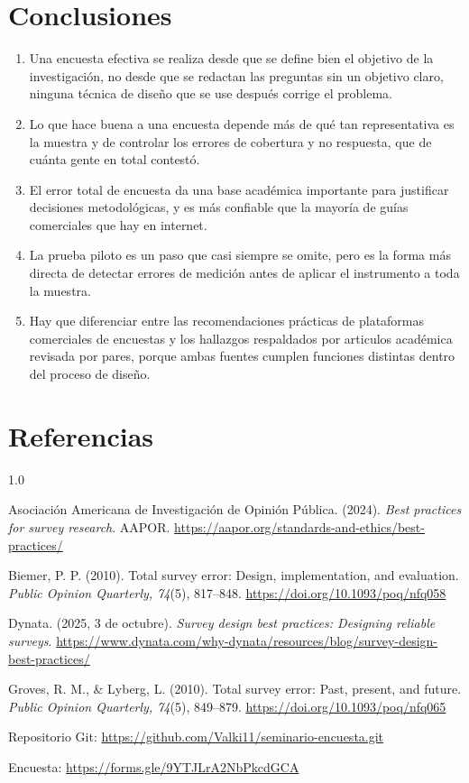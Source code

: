 \documentclass[12pt,letterpaper]{article}
\begin{document}
\section*{Conclusiones}

\begin{enumerate}[label=\arabic*., leftmargin=*]
\item Una encuesta efectiva se realiza desde que se define bien el objetivo de la investigación, no desde que se redactan las preguntas  sin un objetivo claro, ninguna técnica de diseño que se use después corrige el problema.
\item Lo que hace buena a una encuesta depende más de qué tan representativa es la muestra y de controlar los errores de cobertura y no respuesta, que de cuánta gente en total contestó.
\item El error total de encuesta da una base académica importante para justificar decisiones metodológicas, y es más confiable que la mayoría de guías comerciales que hay en internet.
\item La prueba piloto es un paso que casi siempre se omite, pero es la forma más directa de detectar errores de medición antes de aplicar el instrumento a toda la muestra.
\item Hay que diferenciar entre las recomendaciones prácticas de plataformas comerciales de encuestas y los hallazgos respaldados por articulos académica revisada por pares, porque ambas fuentes cumplen funciones distintas dentro del proceso de diseño.
\end{enumerate}

\section*{Referencias}

\begin{spacing}{1.0}
\setlength{\parindent}{-1.27cm}
\setlength{\leftskip}{1.27cm}

Asociación Americana de Investigación de Opinión Pública. (2024). \textit{Best practices for survey research}. AAPOR. \url{https://aapor.org/standards-and-ethics/best-practices/}

Biemer, P. P. (2010). Total survey error: Design, implementation, and evaluation. \textit{Public Opinion Quarterly, 74}(5), 817--848. \url{https://doi.org/10.1093/poq/nfq058}

Dynata. (2025, 3 de octubre). \textit{Survey design best practices: Designing reliable surveys}. \url{https://www.dynata.com/why-dynata/resources/blog/survey-design-best-practices/}

Groves, R. M., \& Lyberg, L. (2010). Total survey error: Past, present, and future. \textit{Public Opinion Quarterly, 74}(5), 849--879. \url{https://doi.org/10.1093/poq/nfq065}

\end{spacing}

\vspace{12pt}
\noindent\small Repositorio Git: \url{https://github.com/Valki11/seminario-encuesta.git}

\noindent\small Encuesta: \url{https://forms.gle/9YTJLrA2NbPkcdGCA}
\end{document}
